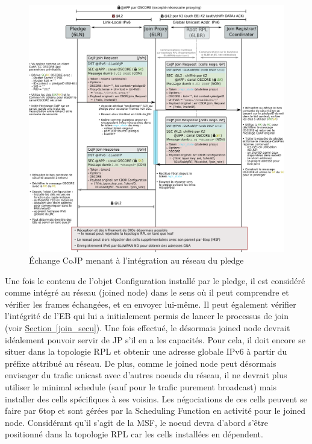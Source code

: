\documentclass[]{report}
\newcommand{\wordlink}[2]{\hyperref[#2]{#1~\ref{#2}}}
\begin{document}
\vspace{0.2cm}
	\begin{figure}[!h]
	\centering
	\includegraphics[width=\linewidth]{Joining_phase_part2}
	\caption{Échange CoJP menant à l'intégration au réseau du pledge}
	\label{fig:join_part2}
	\end{figure}
\vspace{0.2cm}

\newpage

Une fois le contenu de l'objet Configuration installé par le pledge, il est considéré comme intégré au réseau (joined node) dans le sens où il peut comprendre et vérifier les frames échangées, et en envoyer lui-même. Il peut également vérifier l'intégrité de l'EB qui lui a initialement permis de lancer le processus de join (voir \wordlink{Section}{join_secu}). Une fois effectué, le désormais joined node devrait idéalement pouvoir servir de JP s'il en a les capacités. Pour cela, il doit encore se situer dans la topologie RPL et obtenir une adresse globale IPv6 à partir du préfixe attribué au réseau. De plus, comme le joined node peut désormais envisager du trafic unicast avec d'autres noeuds du réseau, il ne devrait plus utiliser le minimal schedule (sauf pour le trafic purement broadcast) mais installer des cells spécifiques à ses voisins. Les négociations de ces cells peuvent se faire par 6top et sont gérées par la Scheduling Function en activité pour le joined node. Considérant qu'il s'agit de la MSF, le noeud devra d'abord s'être positionné dans la topologie RPL car les cells installées en dépendent.\\
\end{document}
